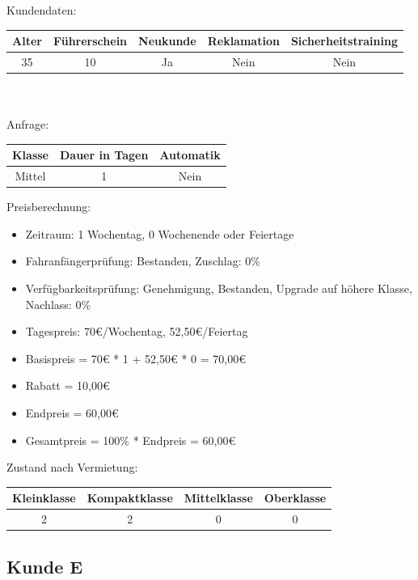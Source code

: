 Kundendaten:\\
\begin{tabular}{|c|c|c|c|c|}
	\hline \textbf{Alter} & \textbf{Führerschein} & \textbf{Neukunde} & \textbf{Reklamation} & \textbf{Sicherheitstraining} \\ 
	\hline 35 & 10 & Ja & Nein & Nein \\ 
	\hline 
\end{tabular} 
\\\\
Anfrage:\\
\begin{tabular}{|c|c|c|}
	\hline \textbf{Klasse} & \textbf{Dauer in Tagen} & \textbf{Automatik} \\ 
	\hline Mittel & 1 & Nein \\ 
	\hline 
\end{tabular}

Preisberechnung:
\begin{itemize}
	\item Zeitraum: 1 Wochentag, 0 Wochenende oder Feiertage
	\item Fahranfängerprüfung: Bestanden, Zuschlag: 0\%
	\item Verfügbarkeitsprüfung: Genehmigung, Bestanden, Upgrade auf höhere Klasse, Nachlass: 0\%
	\item Tagespreis: 70€/Wochentag, 52,50€/Feiertag
	\item Basispreis = 70€ * 1 + 52,50€ * 0 = 70,00€
	\item Rabatt = 10,00€
	\item Endpreis = 60,00€
	\item Gesamtpreis = 100\% * Endpreis = 60,00€
\end{itemize}

Zustand nach Vermietung:\\
\begin{tabular}{|c|c|c|c|}
	\hline \textbf{Kleinklasse} & \textbf{Kompaktklasse} & \textbf{Mittelklasse} & \textbf{Oberklasse}  \\ 
	\hline 2 & 2 & 0 & 0 \\ 
	\hline 
\end{tabular}

\subsection{Kunde E}

